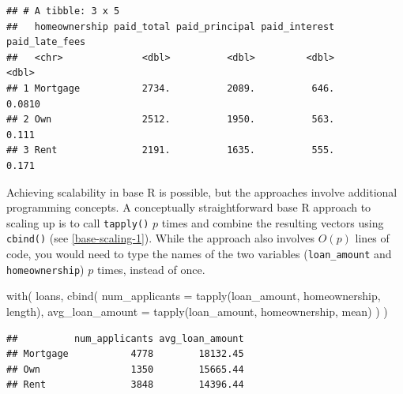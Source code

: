 \documentclass[12pt]{article}
\newenvironment{Shaded}{\begin{snugshade}}{\end{snugshade}}
\newcommand{\AttributeTok}[1]{\textcolor[rgb]{0.77,0.63,0.00}{#1}}
\newcommand{\FunctionTok}[1]{\textcolor[rgb]{0.00,0.00,0.00}{#1}}
\newcommand{\NormalTok}[1]{#1}
\begin{document}
\begin{verbatim}
## # A tibble: 3 x 5
##   homeownership paid_total paid_principal paid_interest paid_late_fees
##   <chr>              <dbl>          <dbl>         <dbl>          <dbl>
## 1 Mortgage           2734.          2089.          646.         0.0810
## 2 Own                2512.          1950.          563.         0.111 
## 3 Rent               2191.          1635.          555.         0.171
\end{verbatim}


\label{across} \linespread{2} \vspace{3mm}\setlength{\parindent}{15pt}

Achieving scalability in base R is possible, but the approaches involve
additional programming concepts. A conceptually straightforward base R
approach to scaling up is to call \texttt{tapply()} \(p\) times and
combine the resulting vectors using \texttt{cbind()} (see
\ref{base-scaling-1}). While the approach also involves \(O(p)\) lines
of code, you would need to type the names of the two variables
(\texttt{loan\_amount} and \texttt{homeownership}) \(p\) times, instead
of once.

\linespread{1}

\begin{Shaded}
\begin{Highlighting}[]
\FunctionTok{with}\NormalTok{(}
\NormalTok{  loans, }
  \FunctionTok{cbind}\NormalTok{(}
    \AttributeTok{num\_applicants =} \FunctionTok{tapply}\NormalTok{(loan\_amount, homeownership, length),}
    \AttributeTok{avg\_loan\_amount =} \FunctionTok{tapply}\NormalTok{(loan\_amount, homeownership, mean)}
\NormalTok{  )}
\NormalTok{)}
\end{Highlighting}
\end{Shaded}

\begin{verbatim}
##          num_applicants avg_loan_amount
## Mortgage           4778        18132.45
## Own                1350        15665.44
## Rent               3848        14396.44
\end{verbatim}


\label{base-scaling-1} \linespread{2}
\vspace{3mm}\setlength{\parindent}{15pt}
\end{document}
